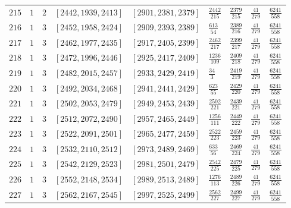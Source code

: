 \documentclass[12pt]{extarticle}
\begin{document}
\begin{longtable}{lllllllll}
$215$ & $1$ & $2$ & $\left[2442, 1939, 2413\right]$ & $\left[2901, 2381, 2379\right]$ & $\frac{2442}{215}$ & $\frac{2379}{215}$ & $\frac{41}{279}$ & $\frac{6241}{558}$ \\
$216$ & $1$ & $3$ & $\left[2452, 1958, 2424\right]$ & $\left[2909, 2393, 2389\right]$ & $\frac{613}{54}$ & $\frac{2389}{216}$ & $\frac{41}{279}$ & $\frac{6241}{558}$ \\
$217$ & $1$ & $3$ & $\left[2462, 1977, 2435\right]$ & $\left[2917, 2405, 2399\right]$ & $\frac{2462}{217}$ & $\frac{2399}{217}$ & $\frac{41}{279}$ & $\frac{6241}{558}$ \\
$218$ & $1$ & $3$ & $\left[2472, 1996, 2446\right]$ & $\left[2925, 2417, 2409\right]$ & $\frac{1236}{109}$ & $\frac{2409}{218}$ & $\frac{41}{279}$ & $\frac{6241}{558}$ \\
$219$ & $1$ & $3$ & $\left[2482, 2015, 2457\right]$ & $\left[2933, 2429, 2419\right]$ & $\frac{34}{3}$ & $\frac{2419}{219}$ & $\frac{41}{279}$ & $\frac{6241}{558}$ \\
$220$ & $1$ & $3$ & $\left[2492, 2034, 2468\right]$ & $\left[2941, 2441, 2429\right]$ & $\frac{623}{55}$ & $\frac{2429}{220}$ & $\frac{41}{279}$ & $\frac{6241}{558}$ \\
$221$ & $1$ & $3$ & $\left[2502, 2053, 2479\right]$ & $\left[2949, 2453, 2439\right]$ & $\frac{2502}{221}$ & $\frac{2439}{221}$ & $\frac{41}{279}$ & $\frac{6241}{558}$ \\
$222$ & $1$ & $3$ & $\left[2512, 2072, 2490\right]$ & $\left[2957, 2465, 2449\right]$ & $\frac{1256}{111}$ & $\frac{2449}{222}$ & $\frac{41}{279}$ & $\frac{6241}{558}$ \\
$223$ & $1$ & $3$ & $\left[2522, 2091, 2501\right]$ & $\left[2965, 2477, 2459\right]$ & $\frac{2522}{223}$ & $\frac{2459}{223}$ & $\frac{41}{279}$ & $\frac{6241}{558}$ \\
$224$ & $1$ & $3$ & $\left[2532, 2110, 2512\right]$ & $\left[2973, 2489, 2469\right]$ & $\frac{633}{56}$ & $\frac{2469}{224}$ & $\frac{41}{279}$ & $\frac{6241}{558}$ \\
$225$ & $1$ & $3$ & $\left[2542, 2129, 2523\right]$ & $\left[2981, 2501, 2479\right]$ & $\frac{2542}{225}$ & $\frac{2479}{225}$ & $\frac{41}{279}$ & $\frac{6241}{558}$ \\
$226$ & $1$ & $3$ & $\left[2552, 2148, 2534\right]$ & $\left[2989, 2513, 2489\right]$ & $\frac{1276}{113}$ & $\frac{2489}{226}$ & $\frac{41}{279}$ & $\frac{6241}{558}$ \\
$227$ & $1$ & $3$ & $\left[2562, 2167, 2545\right]$ & $\left[2997, 2525, 2499\right]$ & $\frac{2562}{227}$ & $\frac{2499}{227}$ & $\frac{41}{279}$ & $\frac{6241}{558}$ \\

\end{longtable}
\end{document}
